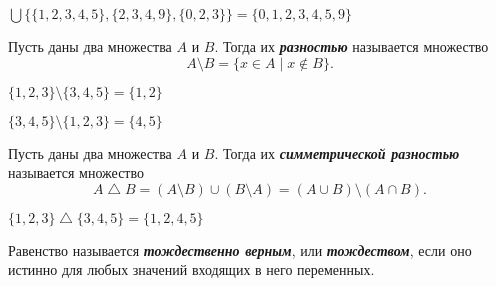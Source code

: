 \documentclass{article}
\begin{document}
    \begin{example}
        $\bigcup \{\{1,2,3,4,5\}, \{2,3,4,9\}, \{0,2,3\}\} = \{0,1,2,3,4,5,9\}$
    \end{example}

    \begin{definition_boxed}
        Пусть даны два множества $A$ и $B$.
        Тогда их \textbf{\textit{разностью}} называется множество
        \[A \setminus B =\{x\in A\mid x\not\in B\}.\]
    \end{definition_boxed}

    \begin{example}
        $\{1,2,3\} \setminus \{3,4,5\} = \{1,2\}$
    \end{example}
    \begin{example}
        $\{3,4,5\} \setminus \{1,2,3\} = \{4,5\}$
    \end{example}

    \begin{definition_boxed}
        Пусть даны два множества $A$ и $B$.
        Тогда их \textbf{\textit{симметрической разностью}} называется множество
        \[A \bigtriangleup B =\left( A \setminus B \right) \cup \left ( B \setminus A \right) = \left(A \cup B\right) \setminus \left(A \cap B\right).\]

    \end{definition_boxed}

    \begin{example}
        $\{1,2,3\} \bigtriangleup \{3,4,5\} = \{1,2,4,5\}$
    \end{example}

    \begin{definition_boxed}
        Равенство называется \textit{\textbf{тождественно верным}}, или \textit{\textbf{тождеством}}, если оно истинно для любых значений входящих в него переменных.
    \end{definition_boxed}
\end{document}
